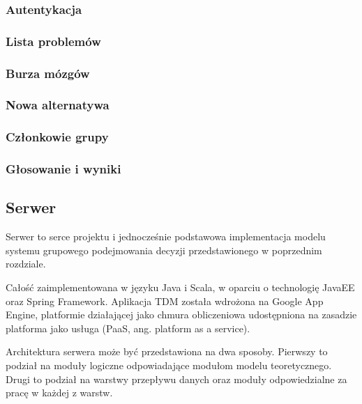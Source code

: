 \subsubsection{Autentykacja}

\subsubsection{Lista problemów}

\subsubsection{Burza mózgów}

\subsubsection{Nowa alternatywa}

\subsubsection{Członkowie grupy}

\subsubsection{Głosowanie i wyniki}

\subsection{Serwer}
Serwer to serce projektu i jednocześnie podstawowa implementacja modelu systemu
grupowego podejmowania decyzji przedstawionego w poprzednim rozdziale. 

Całość zaimplementowana w języku Java i Scala, w oparciu o technologię JavaEE
oraz Spring Framework. Aplikacja TDM została wdrożona na Google App Engine,
platformie działającej jako chmura obliczeniowa udostępniona na
zasadzie platforma jako usługa (PaaS, ang. platform as a service).

Architektura serwera może być przedstawiona na dwa sposoby. Pierwszy to podział
na moduły logiczne odpowiadające modułom modelu teoretycznego. Drugi to podział
na warstwy przepływu danych oraz moduły odpowiedzialne za pracę w każdej z warstw.

